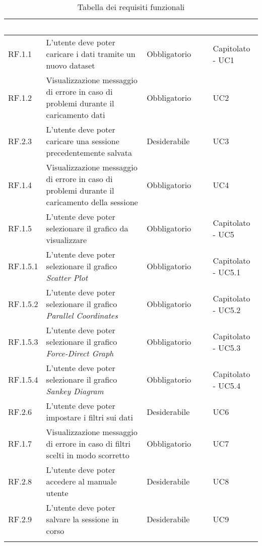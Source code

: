\begin{center}
  \centering
  \begin{longtable}{|L{1,5cm}|C{5,5cm}|C{3cm}|C{2cm}|}
    \hline
    \textcolor[HTML]{FFFFFF}{\textbf{Codice}} & \textcolor[HTML]{FFFFFF}{\textbf{Descrizione}} & \textcolor[HTML]{FFFFFF}{\textbf{Classificazione}} & \textcolor[HTML]{FFFFFF}{\textbf{Fonti}}
    \\ \hline
    RF.1.1 & L'utente deve poter caricare i dati tramite un nuovo dataset & Obbligatorio & Capitolato - UC1 \\ \hline
    RF.1.2 & Visualizzazione messaggio di errore in caso di problemi durante il caricamento dati & Obbligatorio & UC2 \\ \hline
    RF.2.3 & L'utente deve poter caricare una sessione precedentemente salvata & Desiderabile & UC3 \\ \hline
    RF.1.4 & Visualizzazione messaggio di errore in caso di problemi durante il caricamento della sessione & Obbligatorio & UC4 \\ \hline
    RF.1.5 & L'utente deve poter selezionare il grafico da visualizzare & Obbligatorio & Capitolato - UC5 \\ \hline
    RF.1.5.1 & L'utente deve poter selezionare il grafico \textit{Scatter Plot} & Obbligatorio & Capitolato - UC5.1 \\ \hline
    RF.1.5.2 & L'utente deve poter selezionare il grafico \textit{Parallel Coordinates} & Obbligatorio & Capitolato - UC5.2 \\ \hline
    RF.1.5.3 & L'utente deve poter selezionare il grafico \textit{Force-Direct Graph} & Obbligatorio & Capitolato - UC5.3 \\ \hline
    RF.1.5.4 & L'utente deve poter selezionare il grafico \textit{Sankey Diagram} & Obbligatorio & Capitolato - UC5.4 \\ \hline
    RF.2.6 & L'utente deve poter impostare i filtri sui dati & Desiderabile & UC6 \\ \hline
    RF.1.7 & Visualizzazione messaggio di errore in caso di filtri scelti in modo scorretto & Obbligatorio & UC7 \\ \hline
    RF.2.8 & L'utente deve poter accedere al manuale utente & Desiderabile & UC8 \\ \hline
    RF.2.9 & L'utente deve poter salvare la sessione in corso & Desiderabile & UC9 \\ \hline

    \caption{Tabella dei requisiti funzionali}
  \end{longtable}
\end{center}

